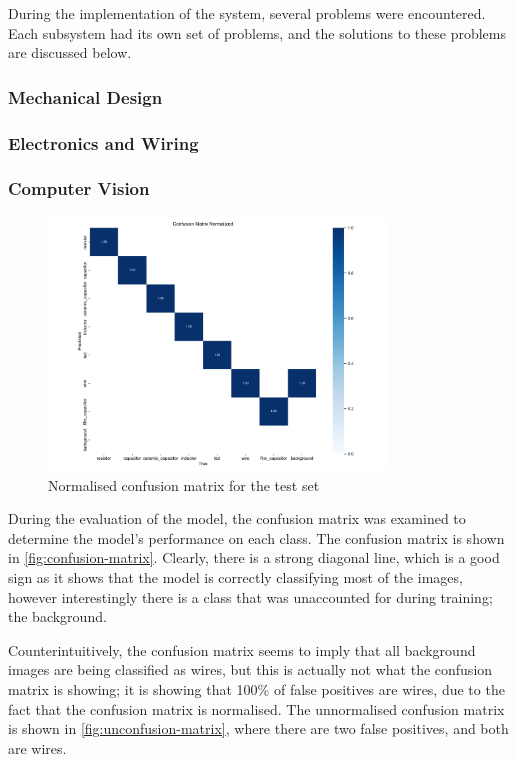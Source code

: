 During the implementation of the system, several problems were encountered. Each subsystem had its own set of problems, and the solutions to these problems are discussed below.

\subsubsection{Mechanical Design}

\subsubsection{Electronics and Wiring}

\subsubsection{Computer Vision}

\begin{figure}[H]
    \centering
    \includegraphics[width=0.8\textwidth]{imgs/graphs/confusion_matrix_test.png}
    \caption{Normalised confusion matrix for the test set}
    \label{fig:confusion-matrix}
  \end{figure}

During the evaluation of the model, the confusion matrix was examined to determine the model's performance on each class. The confusion matrix is shown in \autoref{fig:confusion-matrix}. Clearly, there is a strong diagonal line, which is a good sign as it shows that the model is correctly classifying most of the images, however interestingly there is a class that was unaccounted for during training; the background. 

Counterintuitively, the confusion matrix seems to imply that all background images are being classified as wires, but this is actually not what the confusion matrix is showing; it is showing that 100\% of false positives are wires, due to the fact that the confusion matrix is normalised. The unnormalised confusion matrix is shown in \autoref{fig:unconfusion-matrix}, where there are two false positives, and both are wires.

